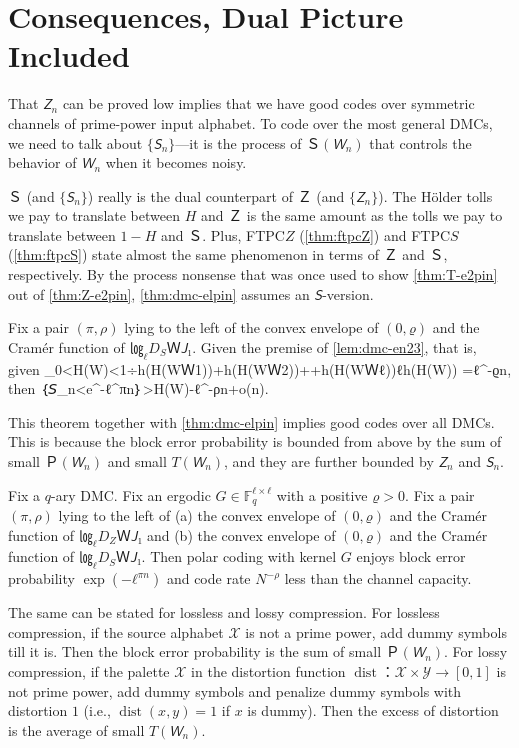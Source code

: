 \documentclass[openany]{amsbook}
\numberwithin{equation}{chapter}
\numberwithin{figure}{chapter}
\numberwithin{table}{chapter}
\DeclareMathOperator\dist{dist}
\def\[#1\]{\begin{equation*}{#1}\end{equation*}}
\theoremstyle{definition}	理dfn:Definition~?s			理exa:Example~?s
\theoremstyle{remark}		理cla:Claim~?s				理rem:Remark~?s
\begin{document}
\section{Consequences, Dual Picture Included}

	That $𝘡_n$ can be proved low implies that we have good codes over
	symmetric channels of prime-power input alphabet.
	To code over the most general DMCs, we need to talk about $\{𝘚_n\}$---it is
	the process of $Ｓ(𝘞_n)$ that controls the behavior of $𝘞_n$ when it becomes noisy.
	
	$Ｓ$ (and $\{𝘚_n\}$) really is the dual counterpart of $Ｚ$ (and $\{𝘡_n\}$).
	The Hölder tolls we pay to translate between $H$ and $Ｚ$
	is the same amount as the tolls we pay to translate between $1-H$ and $Ｓ$.
	Plus, FTPC$Z$ (\cref{thm:ftpcZ}) and FTPC$S$ (\cref{thm:ftpcS}) state
	almost the same phenomenon in terms of $Ｚ$ and $Ｓ$, respectively.
	By the process nonsense that was once used to show \cref{thm:T-e2pin}
	out of \cref{thm:Z-e2pin}, \cref{thm:dmc-elpin} assumes an $𝘚$-version.
	
	\begin{thm}
		Fix a pair $(π,ρ)$ lying to the left of the convex envelope of
		$(0,ϱ)$ and the Cramér function of $㏒_ℓD_SＷ{𝘑₁}$.
		Given the premise of \cref{lem:dmc-en23}, that is, given
		\[\sup_{0<H(W)<1}÷{h(H(WＷ1))+h(H(WＷ2))+\dotsb+h(H(WＷ{ℓ}))}{ℓh(H(W))}
			=ℓ^{-ϱn},\]
		then
		\[𝘗｛𝘚_n<e^{-ℓ^{πn}}｝>H(W)-ℓ^{-ρn+o(n)}.\]
	\end{thm}
	
	This theorem together with \cref{thm:dmc-elpin} implies good codes over all DMCs.
	This is because the block error probability is bounded from above
	by the sum of small $Ｐ(𝘞_n)$ and small $T(𝘞_n)$,
	and they are further bounded by $𝘡_n$ and $𝘚_n$.
	
	\begin{cor}
		Fix a $q$-ary DMC.
		Fix an ergodic $G∈𝔽_q^{ℓ×ℓ}$ with a positive $ϱ>0$.
		Fix a pair $(π,ρ)$ lying to the left of
		(a)	the convex envelope of $(0,ϱ)$ and the Cramér function of $㏒_ℓD_ZＷ{𝘑₁}$ and
		(b)	the convex envelope of $(0,ϱ)$ and the Cramér function of $㏒_ℓD_SＷ{𝘑₁}$.
		Then polar coding with kernel $G$ enjoys block error probability $\exp(-ℓ^{πn})$
		and code rate $N^{-ρ}$ less than the channel capacity.
	\end{cor}
	
	The same can be stated for lossless and lossy compression.
	For lossless compression, if the source alphabet $𝒳$
	is not a prime power, add dummy symbols till it is.
	Then the block error probability is the sum of small $Ｐ(𝘞_n)$.
	For lossy compression, if the palette $𝒳$ in the distortion function
	$\dist：𝒳×𝒴→[0,1]$ is not prime power, add dummy symbols and
	penalize dummy symbols with distortion $1$ (i.e., $\dist(x,y)=1$ if $x$ is dummy).
	Then the excess of distortion is the average of small $T(𝘞_n)$.
	
\end{document}
